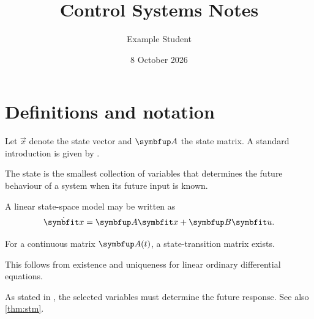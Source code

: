 \documentclass[english,screen,twoside]{noahnotes}
\title{Control Systems Notes}
\author{Example Student}
\date{8 October 2026}
\begin{document}
\frontmatter
\maketitle
\tableofcontents

\mainmatter

\label{lec:state-models}

\section{Definitions and notation}

Let \(\Vec{x}\) denote the state vector and \(\Mat{A}\) the state matrix.
A standard introduction is given by \textcite{ogata2010}.

\begin{definition}[State]\label{def:state}
The state is the smallest collection of variables that determines the future
behaviour of a system when its future input is known.
\end{definition}

\begin{example}\label{ex:second-order}
A linear state-space model may be written as
\[
  \dot{\Vec{x}} = \Mat{A}\Vec{x} + \Mat{B}\Vec{u}.
\]
\end{example}

\begin{theorem}\label{thm:stm}
For a continuous matrix \(\Mat{A}(t)\), a state-transition matrix exists.

\proofpart
This follows from existence and uniqueness for linear ordinary differential
equations.
\end{theorem}

As stated in , the selected variables must determine the
future response. See also \cref{thm:stm}.

\backmatter
\printbibliography[heading=bibintoc,title={References}]
\end{document}
